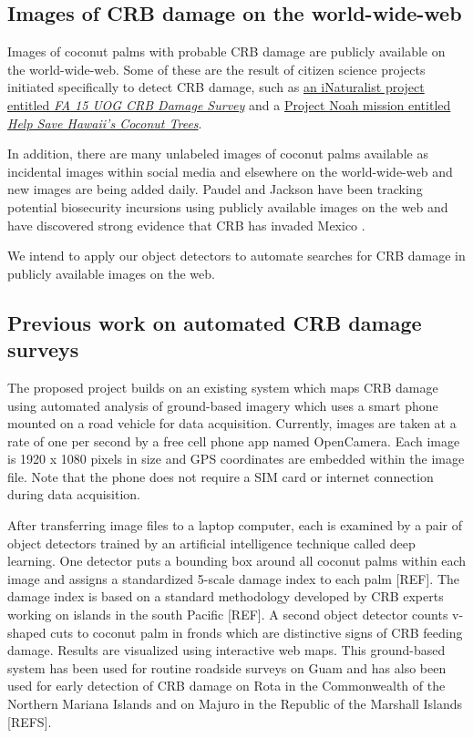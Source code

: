 \documentclass[11pt,english,letterpaper]{scrartcl}
\begin{document}
\subsection{Images of CRB damage on the world-wide-web}

Images of coconut palms with probable CRB damage are publicly available on the world-wide-web. Some of these are the result of citizen science projects initiated specifically to detect CRB damage, such as \href{https://www.inaturalist.org/projects/retired-fa-15-uog-crb-damage-survey}{an iNaturalist project entitled \textit{FA 15 UOG CRB Damage Survey}} and a \href{https://www.projectnoah.org/missions/182566002}{Project Noah mission entitled \textit{Help Save Hawaii's Coconut Trees}}.

In addition, there are many unlabeled images of coconut palms available as incidental images within social media and elsewhere on the world-wide-web and new images are being added daily. Paudel and Jackson have been tracking potential biosecurity incursions using publicly available images on the web \cite{Paudel2023} and have discovered strong evidence that CRB has invaded Mexico \cite{Jackson2022}.

We intend to apply our object detectors to automate searches for CRB damage in publicly available images on the web.

\subsection{Previous work on automated CRB damage surveys}
\label{previous_work}
The proposed project builds on an existing system which maps CRB damage using automated analysis of ground-based imagery which uses a smart phone mounted on a road vehicle for data acquisition. Currently, images are taken at a rate of one per second by a free cell phone app named OpenCamera. Each image is 1920 x 1080 pixels in size and GPS coordinates are embedded within the image file. Note that the phone does not require a SIM card or internet connection during data acquisition. 

After transferring image files to a laptop computer, each is examined by a pair of object detectors trained by an artificial intelligence technique called deep learning. One detector puts a bounding box around all coconut palms within each image and assigns a standardized 5-scale damage index to each palm [REF]. The damage index is based on a standard methodology developed by CRB experts working on islands in the south Pacific [REF]. A second object detector counts v-shaped cuts to coconut palm in fronds which are distinctive signs of CRB feeding damage. Results are visualized using interactive web maps. This ground-based system has been used for routine roadside surveys on Guam and has also been used for early detection of CRB damage on Rota in the Commonwealth of the Northern Mariana Islands and on Majuro in the Republic of the Marshall Islands [REFS].
\end{document}
